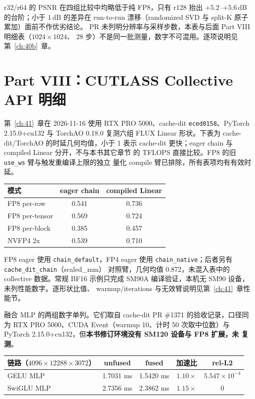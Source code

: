 r32/r64 的 PSNR 在四组比较中均略低于纯 FP8，只有 r128 抬出
$+5.2$--$+5.6\,\mathrm{dB}$ 的台阶；小于 $1\,\mathrm{dB}$ 的差异在
run-to-run 漂移（randomized SVD 与 split-K 原子累加）面前不作优劣结论。
PR 未列明分辨率与采样步数，本表与后面 Part VIII 明细表（$1024\times1024$、
28 步）不是同一批测量，数字不可混用。逐项说明见第~\ref{ch:40b}~章。

\section{Part VIII：CUTLASS Collective API 明细}

第~\ref{ch:41}~章在 2026-11-16 使用 RTX PRO 5000、cache-dit
\texttt{eced0158}、PyTorch 2.15.0+cu132 与 TorchAO 0.18.0 复测六组 FLUX
Linear 形状。下表为 cache-dit/TorchAO 的时延几何均值，小于 1 表示
cache-dit 更快；eager chain 与 compiled Linear 分开，不与本书其它章节
的 TFLOPS 直接比较。FP8 的旧 \texttt{use\_ws} 臂与触发重编译上限的独立
量化 compile 臂已排除，所有表项均有有效时延。

\begin{center}\small
\begin{tabular}{lcc}
\toprule
模式 & eager chain & compiled Linear \\
\midrule
FP8 per-row & 0.541 & 0.736 \\
FP8 per-tensor & 0.569 & 0.724 \\
FP8 per-block & 0.385 & 0.457 \\
NVFP4 2x & 0.539 & 0.710 \\
\bottomrule
\end{tabular}
\end{center}

FP8 eager 使用 \texttt{chain\_default}，FP4 eager 使用
\texttt{chain\_native}；后者另有 \texttt{cache\_dit\_chain}（scaled\_mm）
对照臂，几何均值 0.872，未混入表中的 collective 数据。常规 BF16 示例只完成
SM90A 编译验证，本机无 SM90 设备，未列性能数字。逐形状比值、
warmup/iterations 与无效臂说明见第~\ref{ch:41}~章性能节。

融合 MLP 的两组数字单列。它们取自 cache-dit PR \#1371 的验收记录，口径同为
RTX PRO 5000、CUDA Event（warmup 10、计时 50 次取中位数）与
PyTorch 2.15.0+cu132，但\textbf{本书修订环境没有 SM120 设备与 FP8 扩展，未
复测}。

\begin{center}\small
\begin{tabular}{lcccc}
\toprule
链路（$4096\times12288\times3072$） & unfused & fused & 加速比 & rel-L2 \\
\midrule
GELU MLP   & 1.7031 ms & 1.5420 ms & $1.10\times$ & $5.547\times10^{-4}$ \\
SwiGLU MLP & 2.7356 ms & 2.3862 ms & $1.15\times$ & $0$ \\
\bottomrule
\end{tabular}
\end{center}


